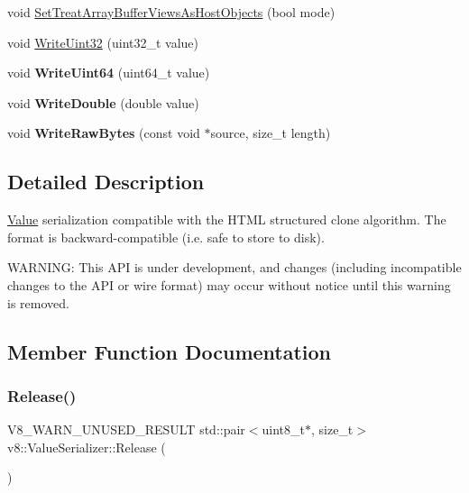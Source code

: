 \begin{DoxyCompactItemize}
\item 
void \mbox{\hyperlink{classv8_1_1ValueSerializer_ae5e570983dfe928e15d6cc56755248c4}{Set\+Treat\+Array\+Buffer\+Views\+As\+Host\+Objects}} (bool mode)
\item 
void \mbox{\hyperlink{classv8_1_1ValueSerializer_a8345af97eb58727384cab6a2738924d1}{Write\+Uint32}} (uint32\+\_\+t value)
\item 
\mbox{\label{classv8_1_1ValueSerializer_a48a33b02dc8dd383be655e5627c0a070}} 
void {\bfseries Write\+Uint64} (uint64\+\_\+t value)
\item 
\mbox{\label{classv8_1_1ValueSerializer_a4da99527143807156385004385e98ed8}} 
void {\bfseries Write\+Double} (double value)
\item 
\mbox{\label{classv8_1_1ValueSerializer_ae01d5c86517fad7ad1c191b9ff6c30e7}} 
void {\bfseries Write\+Raw\+Bytes} (const void $\ast$source, size\+\_\+t length)
\end{DoxyCompactItemize}


\subsection{Detailed Description}
\mbox{\hyperlink{classv8_1_1Value}{Value}} serialization compatible with the H\+T\+ML structured clone algorithm. The format is backward-\/compatible (i.\+e. safe to store to disk).

W\+A\+R\+N\+I\+NG\+: This A\+PI is under development, and changes (including incompatible changes to the A\+PI or wire format) may occur without notice until this warning is removed. 

\subsection{Member Function Documentation}
\mbox{\label{classv8_1_1ValueSerializer_abab0c48c963cd11f98478a4ccc04509c}} 
\subsubsection{\texorpdfstring{Release()}{Release()}}
{\footnotesize\ttfamily V8\+\_\+\+W\+A\+R\+N\+\_\+\+U\+N\+U\+S\+E\+D\+\_\+\+R\+E\+S\+U\+LT std\+::pair$<$uint8\+\_\+t$\ast$, size\+\_\+t$>$ v8\+::\+Value\+Serializer\+::\+Release (\begin{DoxyParamCaption}{ }\end{DoxyParamCaption})}

